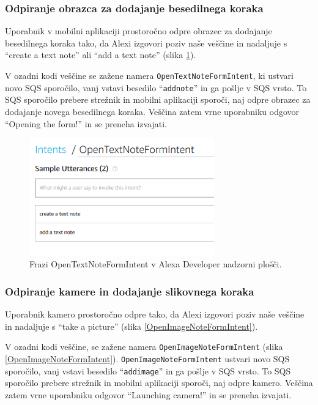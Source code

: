 \documentclass[a4paper, 12pt]{book}
\begin{document}
\subsubsection{Odpiranje obrazca za dodajanje besedilnega koraka}

Uporabnik v mobilni aplikaciji prostoročno odpre obrazec za dodajanje besedilnega koraka tako, da Alexi izgovori poziv naše veščine in nadaljuje s \enquote{create a text note} ali \enquote{add a text note} (slika \ref{OpenTextNoteFormIntent}).

V ozadni kodi veščine se zažene namera \texttt{OpenTextNoteFormIntent}, ki ustvari novo SQS sporočilo, vanj vstavi besedilo \enquote{\texttt{addnote}} in ga pošlje v SQS vrsto.
To SQS sporočilo prebere strežnik in mobilni aplikaciji sporoči, naj odpre obrazec za dodajanje novega besedilnega koraka.
Veščina zatem vrne uporabniku odgovor \enquote{Opening the form!} in se preneha izvajati.

\begin{figure}[H]
\begin{center}
\includegraphics[width=8cm]{intent_text}
\end{center}
\caption{Frazi OpenTextNoteFormIntent v Alexa Developer nadzorni plošči.}
\label{OpenTextNoteFormIntent}
\end{figure}


\subsubsection{Odpiranje kamere in dodajanje slikovnega koraka}

Uporabnik kamero prostoročno odpre tako, da Alexi izgovori poziv naše veščine in nadaljuje s \enquote{take a picture} (slika \ref{OpenImageNoteFormIntent}).

V ozadni kodi veščine, se zažene namera \texttt{OpenImageNoteFormIntent} (slika \ref{OpenImageNoteFormIntent}).
\texttt{OpenImageNoteFormIntent} ustvari novo SQS sporočilo, vanj vstavi besedilo \enquote{\texttt{addimage}} in ga pošlje v SQS vrsto.
To SQS sporočilo prebere strežnik in mobilni aplikaciji sporoči, naj odpre kamero.
Veščina zatem vrne uporabniku odgovor \enquote{Launching camera!} in se preneha izvajati.
\end{document}
